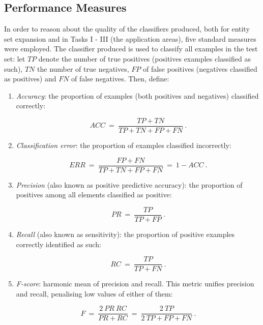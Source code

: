 \documentclass[12pt,twoside,notitlepage,amsart]{report} %
\begin{document}
	\subsection{Performance Measures}
	
	In order to reason about the quality of the classifiers produced, both for entity set expansion and in Tasks I - III (the application areas), five standard measures were employed. The classifier produced is used to classify all examples in the test set: let $TP$ denote the number of true positives (positives examples classified as such), $TN$ the number of true negatives, $FP$ of false positives (negatives classified as positives) and $FN$ of false negatives. Then, define:
	
	\begin{enumerate}
	
	\item \emph{Accuracy}: the proportion of examples (both positives and negatives) classified correctly:
	
	\begin{equation} ACC ~=~ \frac{TP + TN}{TP + TN + FP + FN}~. \end{equation}
	
	\item \emph{Classification error}: the proportion of examples classified incorrectly:
	
	\begin{equation}  ERR ~=~ \frac{FP + FN}{TP + TN + FP + FN} ~=~ 1 - ACC~.  \end{equation}
	
	\item \emph{Precision} (also known as positive predictive accuracy): the proportion of positives among all elements classified as positive:
	
	\begin{equation} PR \ = \  \frac{TP}{ TP + FP}~. \end{equation}
	
	\item \emph{Recall} (also known as sensitivity): the proportion of positive examples correctly identified as such:
	
	\begin{equation} RC \ = \ \frac{TP}{TP + FN}~. \end{equation}
	
	\item \emph{F-score}: harmonic mean of precision and recall. This metric unifies precision and recall, penalising low values of either of them:
	
	\begin{equation} F \ = \ \frac{2\ PR \ RC}{ PR + RC} \ = \ \frac{2\ TP}{2\ TP + FP + FN}~.   \end{equation} 
	
	\end{enumerate}
	
\end{document}
